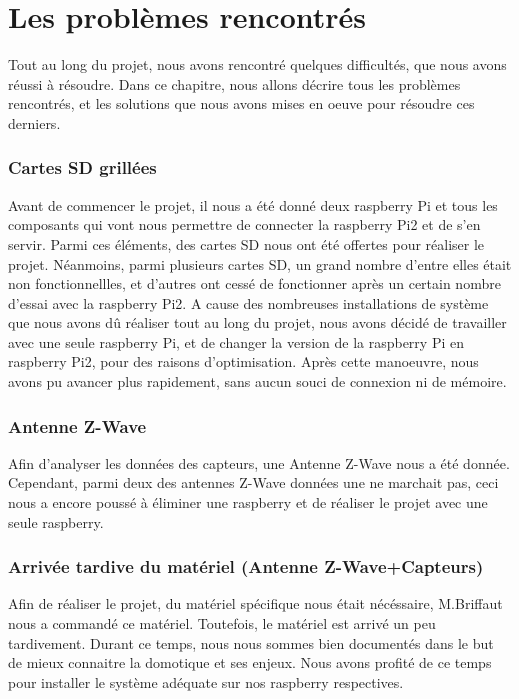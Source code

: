 

\newpage
\chapter{Les problèmes rencontrés}
Tout au long du projet, nous avons rencontré quelques difficultés, que nous avons réussi à résoudre. Dans ce chapitre, nous allons décrire tous les problèmes rencontrés, et les solutions que nous avons mises en oeuve pour résoudre ces derniers.
\subsection{Cartes SD grillées }
Avant de commencer le projet, il nous a été donné deux raspberry Pi et tous les composants qui vont nous permettre de connecter la raspberry Pi2 et de s'en servir.\newline
Parmi ces éléments, des cartes SD nous ont été offertes pour réaliser le projet. Néanmoins, parmi plusieurs cartes SD, un grand nombre d'entre elles était non fonctionnellles, et d'autres ont cessé de fonctionner après un certain nombre d'essai avec la raspberry Pi2.\newline
A cause des nombreuses installations de système que nous avons dû réaliser tout au long du projet, nous avons décidé de travailler avec une seule raspberry Pi, et de changer la version de la raspberry Pi en raspberry Pi2, pour des raisons d'optimisation. Après cette manoeuvre, nous avons pu avancer plus rapidement, sans aucun souci de connexion ni de mémoire.
\subsection{Antenne Z-Wave}
Afin d'analyser les données des capteurs, une Antenne Z-Wave nous a été donnée. Cependant, parmi deux des antennes Z-Wave données une ne marchait pas, ceci nous a encore poussé à éliminer une raspberry et de réaliser le projet avec une seule raspberry.
\subsection{Arrivée tardive du matériel (Antenne Z-Wave+Capteurs)}
Afin de réaliser le projet, du matériel spécifique nous était nécéssaire, M.Briffaut nous a commandé ce matériel.
Toutefois, le matériel est arrivé un peu tardivement. Durant ce temps, nous nous sommes bien documentés dans le but de mieux connaitre la domotique et ses enjeux. Nous avons profité de ce temps pour installer le système adéquate sur nos raspberry respectives.   

